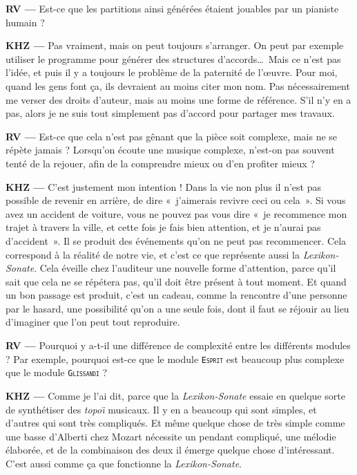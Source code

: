 \documentclass[a4paper,12pt]{article}
\newcommand{\guill}[1]{«~#1~»}
\newcommand{\module}[1]{\texttt{\textsc{#1}}}
\begin{document}
\textbf{RV ---} Est-ce que les partitions ainsi générées étaient jouables par un pianiste humain ?

\textbf{KHZ ---} Pas vraiment, mais on peut toujours s'arranger. On peut par exemple utiliser le programme pour générer des structures d'accords\dots~Mais ce n'est pas l'idée, et puis il y a toujours le problème de la paternité de l'œuvre. Pour moi, quand les gens font ça, ils devraient au moins citer mon nom. Pas nécessairement me verser des droits d'auteur, mais au moins une forme de référence. S'il n'y en a pas, alors je ne suis tout simplement pas d'accord pour partager mes travaux.

\textbf{RV ---} Est-ce que cela n'est pas gênant que la pièce soit complexe, mais ne se répète jamais ? Lorsqu'on écoute une musique complexe, n'est-on pas souvent tenté de la rejouer, afin de la comprendre mieux ou d'en profiter mieux ?

\textbf{KHZ ---} C'est justement mon intention ! Dans la vie non plus il n'est pas possible de revenir en arrière, de dire \guill{j'aimerais revivre ceci ou cela}. Si vous avez un accident de voiture, vous ne pouvez pas vous dire \guill{je recommence mon trajet à travers la ville, et cette fois je fais bien attention, et je n'aurai pas d'accident}. Il se produit des événements qu'on ne peut pas recommencer. Cela correspond à la réalité de notre vie, et c'est ce que représente aussi la \emph{Lexikon-Sonate}. Cela éveille chez l'auditeur une nouvelle forme d'attention, parce qu'il sait que cela ne se répétera pas, qu'il doit être présent à tout moment. Et quand un bon passage est produit, c'est un cadeau, comme la rencontre d'une personne par le hasard, une possibilité qu'on a une seule fois, dont il faut se réjouir au lieu d'imaginer que l'on peut tout reproduire.

\textbf{RV ---} Pourquoi y a-t-il une différence de complexité entre les différents modules ? Par exemple, pourquoi est-ce que le module \module{Esprit} est beaucoup plus complexe que le module \module{Glissandi} ?

\textbf{KHZ ---} Comme je l'ai dit, parce que la \emph{Lexikon-Sonate} essaie en quelque sorte de synthétiser des \emph{topo\"\i} musicaux. Il y en a beaucoup qui sont simples, et d'autres qui sont très compliqués. Et même quelque chose de très simple comme une basse d'Alberti chez Mozart nécessite un pendant compliqué, une mélodie élaborée, et de la combinaison des deux il émerge quelque chose d'intéressant. C'est aussi comme ça que fonctionne la \emph{Lexikon-Sonate}.
\end{document}
